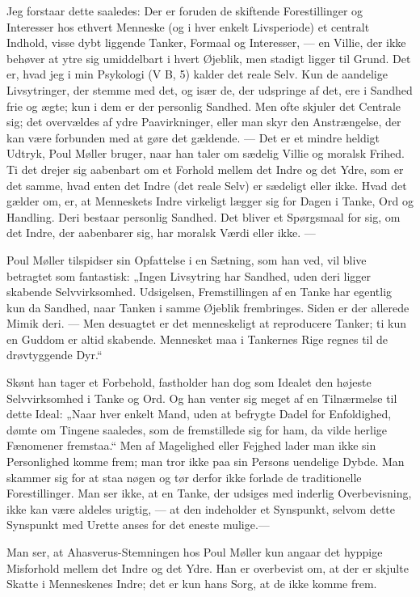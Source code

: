 \documentclass[12pt,a4paper,openany]{book}
\newcommand{\opage}[1]{\marginnote{\footnotesize\textit{[#1]}}}
\begin{document}
Jeg forstaar dette saaledes: Der er foruden de skiftende Forestillinger og
Interesser hos ethvert Menneske (og i hver enkelt Livsperiode) et centralt
Indhold, visse dybt liggende Tanker, Formaal og Interesser, --- en Villie, der
ikke behøver at ytre sig umiddelbart i hvert Øjeblik, men stadigt ligger til
Grund. Det er, hvad jeg i min Psykologi (V B, 5) kalder det reale Selv. Kun de
aandelige Livsytringer, der stemme med det, og især de, der udspringe af det,
ere i Sandhed frie og ægte; kun i dem er der personlig Sandhed. Men ofte
skjuler det Centrale sig; det overvældes af ydre Paavirkninger, eller man skyr
den Anstrængelse, der kan være forbunden med at gøre det gældende. --- Det er
et mindre heldigt Udtryk, Poul Møller bruger, naar han taler om sædelig Villie
og moralsk Frihed. Ti det drejer sig aabenbart om et Forhold mellem det Indre
og det Ydre, som er det samme, hvad enten det Indre (det reale Selv) er
sædeligt eller ikke. Hvad det gælder om, er, at Menneskets Indre virkeligt
lægger sig for Dagen i Tanke, Ord og Handling. Deri bestaar personlig Sandhed.
Det bliver et Spørgsmaal for sig, om det Indre, der aabenbarer sig, har moralsk
Værdi eller ikke. ---

Poul Møller tilspidser sin Opfattelse i en Sætning, som han ved, vil blive
betragtet som fantastisk: „Ingen Livsytring har
\setcounter{footnote}{0}%
\opage{125}Sandhed, uden deri ligger skabende Selvvirksomhed. Udsigelsen,
Fremstillingen af en Tanke har egentlig kun da Sandhed, naar Tanken i samme
Øjeblik frembringes. Siden er der allerede Mimik deri. --- Men desuagtet er det
menneskeligt at reproducere Tanker; ti kun en Guddom er altid skabende.
Mennesket maa i Tankernes Rige regnes til de drøvtyggende Dyr.“

Skønt han tager et Forbehold, fastholder han dog som Idealet den højeste
Selvvirksomhed i Tanke og Ord. Og han venter sig meget af en Tilnærmelse til
dette Ideal: „Naar hver enkelt Mand, uden at befrygte Dadel for Enfoldighed,
dømte om Tingene saaledes, som de fremstillede sig for ham, da vilde herlige
Fænomener fremstaa.“ Men af Magelighed eller Fejghed lader man ikke sin
Personlighed komme frem; man tror ikke paa sin Persons uendelige Dybde. Man
skammer sig for at staa nøgen og tør derfor ikke forlade de traditionelle
Forestillinger. Man ser ikke, at en Tanke, der udsiges med inderlig
Overbevisning, ikke kan være aldeles urigtig, --- at den indeholder et
Synspunkt, selvom dette Synspunkt med Urette anses for det eneste mulige.---

Man ser, at Ahasverus-Stemningen hos Poul Møller kun angaar det hyppige
Misforhold mellem det Indre og det Ydre. Han er overbevist om, at der er
skjulte Skatte i Menneskenes Indre; det er kun hans Sorg, at de ikke komme frem.
\end{document}
